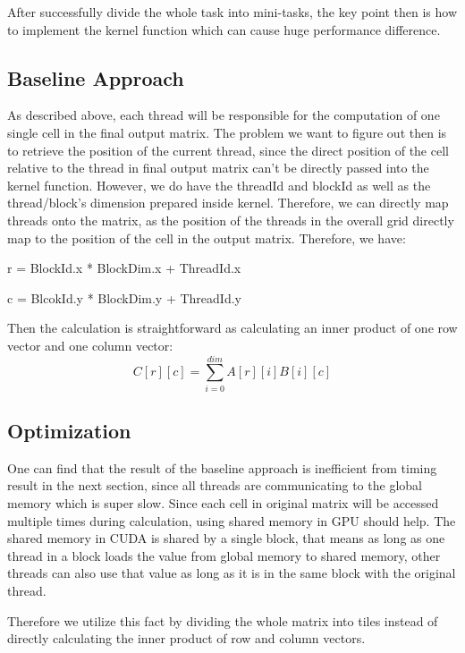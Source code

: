 \documentclass{cs4444}
\begin{document}
	After successfully divide the whole task into mini-tasks, the key point then is how to implement the kernel function which can cause huge performance difference. 
	\subsection{Baseline Approach}
		As described above, each thread will be responsible for the computation of one single cell in the final output matrix. The problem we want to figure out then is to retrieve the position of the current thread, since the direct position of the cell relative to the thread in final output matrix can't be directly passed into the kernel function. However,
		 we do have the threadId and blockId as well as the thread/block's dimension prepared inside kernel. Therefore, we can directly map threads onto the matrix, as the position of the threads in the overall grid directly map to the position of the cell in the output matrix.
		 Therefore, we have:
		 
		 r = BlockId.x * BlockDim.x + ThreadId.x
		 
		 c = BlcokId.y * BlockDim.y + ThreadId.y
		 
		 Then the calculation is straightforward as calculating an inner product of one row vector and one column vector:
		 \[
		 C[r][c] = \sum_{i=0}^{dim}A[r][i]B[i][c]
			\]
		
	\subsection{Optimization}
		One can find that the result of the baseline approach is inefficient	from timing result in the next section, since all threads are communicating to the global memory which is super slow. Since each cell in original matrix will be accessed multiple times during calculation, using shared memory in GPU should help. The shared memory in CUDA is shared by a single block, that means as long as one thread in a block loads the value from global memory to shared memory, other threads can also use that value as long as it is in the same block with the original thread. 
		
		Therefore we utilize this fact by dividing the whole matrix into tiles instead of directly calculating the inner product of row and column vectors.
		
\end{document}
